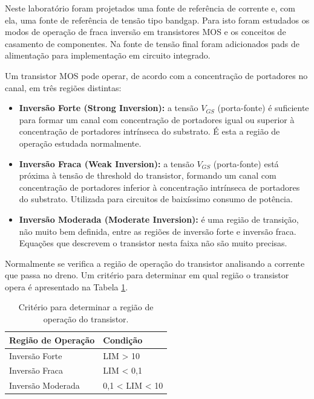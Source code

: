 \documentclass[12pt,a4paper]{article}
\begin{document}
Neste laboratório foram projetados uma fonte de referência de corrente e, com ela, uma fonte de referência de tensão tipo bandgap. Para isto foram estudados os modos de operação de fraca inversão em transistores MOS e os conceitos de casamento de componentes. Na fonte de tensão final foram adicionados pads de alimentação para implementação em circuito integrado.

Um transistor MOS pode operar, de acordo com a concentração de portadores no canal, em três regiões distintas:

\begin{itemize}
    \item \t\textbf{Inversão Forte (Strong Inversion):} a tensão $V_{GS}$ (porta-fonte) é suficiente para formar um canal com concentração de portadores igual ou superior à concentração de portadores intrínseca do substrato. É esta a região de operação estudada normalmente.
    
    \item \t\textbf{Inversão Fraca (Weak Inversion):} a tensão $V_{GS}$ (porta-fonte) está próxima à tensão de threshold do transistor, formando um canal com concentração de portadores inferior à concentração intrínseca de portadores do substrato. Utilizada para circuitos de baixíssimo consumo de potência.
    
    \item \t\textbf{Inversão Moderada (Moderate Inversion):} é uma região de transição, não muito bem definida, entre as regiões de inversão forte e inversão fraca. Equações que descrevem o transistor nesta faixa não são muito precisas.
\end{itemize}

Normalmente se verifica a região de operação do transistor analisando a corrente que passa no dreno. Um critério para determinar em qual região o transistor opera é apresentado na Tabela \ref{tab:operacao}.

\begin{table}[H]
\centering
\caption{Critério para determinar a região de operação do transistor.}
\label{tab:operacao}
\begin{tabular}{@{}ll@{}}
\toprule
\t\textbf{Região de Operação} & \t\textbf{Condição} \\ \midrule
Inversão Forte & LIM > 10 \\
Inversão Fraca & LIM < 0,1 \\
Inversão Moderada & 0,1 < LIM < 10 \\ \bottomrule
\end{tabular}
\end{table}
\end{document}
